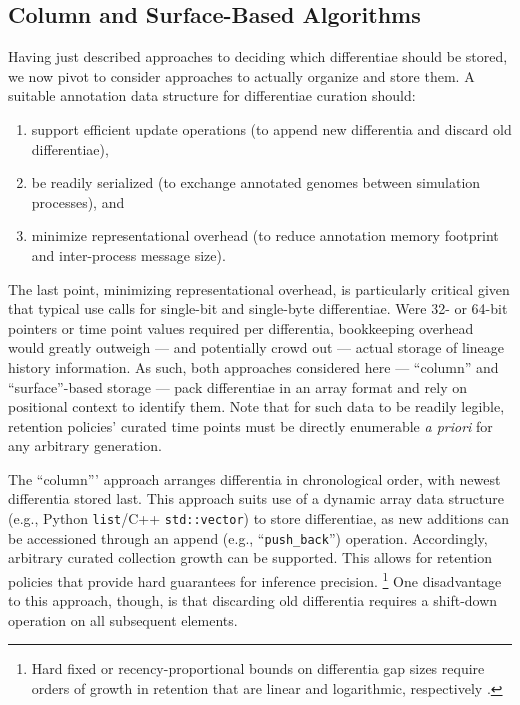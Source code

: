 \subsection{Column and Surface-Based Algorithms}
\label{sec:methods-column-vs-surface-algorithms}

Having just described approaches to deciding which differentiae should be stored, we now pivot to consider approaches to actually organize and store them.
A suitable annotation data structure for differentiae curation should:
\begin{enumerate}
\item support efficient update operations (to append new differentia and discard old differentiae),
\item be readily serialized (to exchange annotated genomes between simulation processes), and
\item minimize representational overhead (to reduce annotation memory footprint and inter-process message size).
\end{enumerate}

The last point, minimizing representational overhead, is particularly critical given that typical use calls for single-bit and single-byte differentiae.
Were 32- or 64-bit pointers or time point values required per differentia, bookkeeping overhead would greatly outweigh --- and potentially crowd out --- actual storage of lineage history information.
As such, both approaches considered here --- ``column'' and ``surface''-based storage --- pack differentiae in an array format and rely on positional context to identify them.
Note that for such data to be readily legible, retention policies' curated time points must be directly enumerable \textit{a priori} for any arbitrary generation.

The ``column''' approach arranges differentia in chronological order, with newest differentia stored last.
This approach suits use of a dynamic array data structure (e.g., Python \texttt{list}/C++ \texttt{std::vector}) to store differentiae, as new additions can be accessioned through an append (e.g., ``\texttt{push\_back}'') operation.
Accordingly, arbitrary curated collection growth can be supported.
This allows for retention policies that provide hard guarantees for inference precision.
\footnote{%
Hard fixed or recency-proportional bounds on differentia gap sizes require orders of growth in retention that are linear and logarithmic, respectively \citep{moreno2024algorithms}.
}
One disadvantage to this approach, though, is that discarding old differentia requires a shift-down operation on all subsequent elements.

